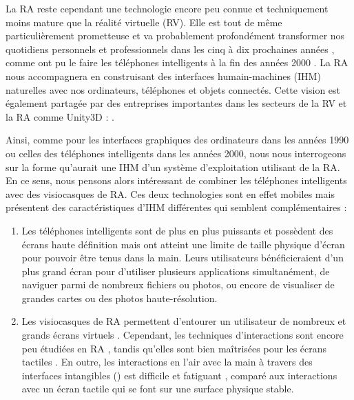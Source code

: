 La RA reste cependant une technologie encore peu connue et techniquement moins mature que la réalité virtuelle (RV). Elle est tout de même particulièrement prometteuse et va probablement profondément transformer nos quotidiens personnels et professionnels dans les cinq à dix prochaines années , comme ont pu le faire les téléphones intelligents à la fin des années 2000 \citep{Chaffey2018}. La RA nous accompagnera en construisant des interfaces humain-machines (IHM) naturelles avec nos ordinateurs, téléphones et objets connectés. Cette vision est également partagée par des entreprises importantes dans les secteurs de la RV et la RA comme Unity3D :  \citep{UnityFutureMRPartIII2017}.

Ainsi, comme pour les interfaces graphiques des ordinateurs dans les années 1990 ou celles des téléphones intelligents dans les années 2000, nous nous interrogeons sur la forme qu'aurait une IHM d'un système d'exploitation utilisant de la RA. En ce sens, nous pensons alors intéressant de combiner les téléphones intelligents avec des visiocasques de RA. Ces deux technologies sont en effet mobiles mais présentent des caractéristiques d'IHM différentes qui semblent complémentaires :
\begin{enumerate}
  \item Les téléphones intelligents sont de plus en plus puissants et possèdent des écrans haute définition mais ont atteint une limite de taille physique d'écran pour pouvoir être tenus dans la main. Leurs utilisateurs bénéficieraient d'un plus grand écran pour d'utiliser plusieurs applications simultanément, de naviguer parmi de nombreux fichiers ou photos, ou encore de visualiser de grandes cartes ou des photos haute-résolution.
  \item Les visiocasques de RA permettent d'entourer un utilisateur de nombreux et grands écrans virtuels \citep{Ens2014}. Cependant, 
  les techniques d'interactions sont encore peu étudiées en RA \citep{Piumsomboon2013}, tandis qu'elles sont bien maîtrisées pour les écrans tactiles \citep{Wobbrock2009}. En outre, les interactions en l'air avec la main à travers des interfaces intangibles () est difficile \citep{Chan2010} et fatiguant \citep{Hincapie-Ramos2014}, comparé aux interactions avec un écran tactile qui se font sur une surface physique stable.
\end{enumerate}
\medskip

